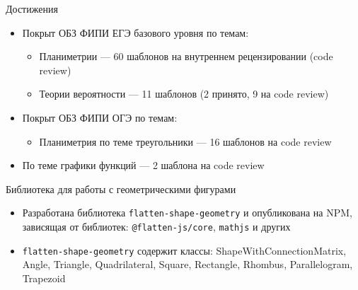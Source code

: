 \documentclass[aspectratio=169,12pt]{beamer}
\begin{document}

\begin{frame}{Достижения}
	\begin{itemize}
		\item Покрыт ОБЗ ФИПИ ЕГЭ базового уровня по темам:
		      \begin{itemize}
			      \item Планиметрии — 60 шаблонов на внутреннем рецензировании (code review)
			      \item Теории вероятности — 11 шаблонов (2  принято, 9 на code review)
		      \end{itemize}
		\item Покрыт ОБЗ ФИПИ ОГЭ по темам:
		\begin{itemize}
			\item Планиметрия по теме треугольники — 16 шаблонов на code review
		\end{itemize}
		\item По теме графики функций — 2 шаблона на code review
	\end{itemize}
\end{frame}

\begin{frame}{Библиотека для работы с геометрическими фигурами}
	\begin{itemize}
		\item Разработана библиотека \texttt{flatten-shape-geometry} и опубликована на NPM, зависящая от библиотек:
		      \texttt{@flatten-js/core}, \texttt{mathjs} и других
		\item \texttt{flatten-shape-geometry} содержит классы: ShapeWithConnectionMatrix, Angle,  Triangle, Quadrilateral, Square, Rectangle, Rhombus, Parallelogram, Trapezoid
	\end{itemize}
\end{frame}
\end{document}

